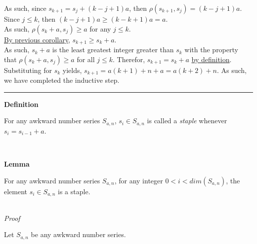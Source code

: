 \documentclass[a4paper,12pt]{article}
\begin{document}
\noindent As such, since $s_{k + 1} = s_j + (k - j + 1)a$, then $\rho(s_{k + 1}, s_j) = (k - j + 1)a$.\\

\noindent Since $j \leq k$, then $(k - j + 1)a \geq (k - k + 1)a = a$.\\

\noindent As such, $\rho(s_k + a, s_j) \geq a$ for any $j \leq k$.\\

\noindent \hyperlink{corollary:non_divisibility_of_elements}{By previous corollary}, $s_{k + 1} \geq s_k + a$.\\

\noindent As such, $s_k + a$ is the least greatest integer greater than $s_k$ with the property that $\rho(s_k + a, s_j) \geq a$ for all $j \leq k$. Therefor, $s_{k + 1} = s_k + a$ \hyperlink{definition:awkward_number_series}{by definition}.\\

\noindent Substituting for $s_k$ yields, $s_{k + 1} = a(k + 1) + n + a = a(k + 2) + n$. As such, we have completed the inductive step.

\begin{center}
\noindent\rule{8cm}{0.4pt}
\end{center}




\label{definition:staple}
\hypertarget{definition:staple}{}
\begin{tcolorbox}
\textbf{Definition}

For any awkward number series $S_{a,n}$, $s_i \in S_{a, n}$ is called a \textit{staple} whenever $s_i = s_{i - 1} + a$.

\end{tcolorbox}
\noindent \\






\label{lemma:initial_staples}
\hypertarget{lemma:initial_staples}{}
\begin{tcolorbox}
\textbf{Lemma}

For any awkward number series $S_{a,n}$, for any integer $0 < i < dim(S_{a,n})$, the element $s_i \in S_{a,n}$ is a staple.

\end{tcolorbox}

\noindent \\
\textit{Proof}

\noindent Let $S_{a, n}$ be any awkward number series.\\
\end{document}
